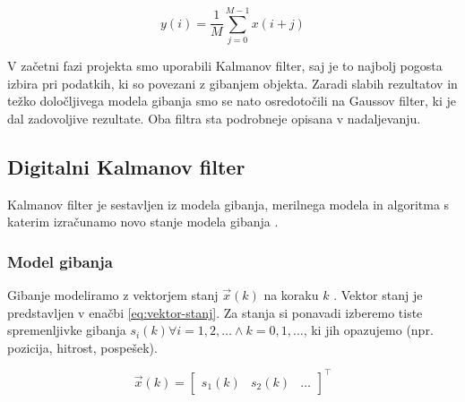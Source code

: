 {\begin{equation}
y(i) = \frac{1}{M} \sum_{j=0}^{M-1} x(i + j)
\label{eq:filter-tekocega-povprecja}
\end{equation}

V začetni fazi projekta smo uporabili Kalmanov filter, saj je to najbolj pogosta izbira pri podatkih, ki so povezani z gibanjem objekta. Zaradi slabih rezultatov in težko določljivega modela gibanja smo se nato osredotočili na Gaussov filter, ki je dal zadovoljive rezultate. Oba filtra sta podrobneje opisana v nadaljevanju.





\subsection{Digitalni Kalmanov filter}\label{sec:kalmanov-filter}
Kalmanov filter je sestavljen iz modela gibanja, merilnega modela in algoritma s katerim izračunamo novo stanje modela gibanja \cite{trucco1998introductory}.

\subsubsection{Model gibanja}
Gibanje modeliramo z vektorjem stanj $\vec{x}(k)$ na koraku $k$ \cite{trucco1998introductory}. Vektor stanj je predstavljen v enačbi \eqref{eq:vektor-stanj}. Za stanja si ponavadi izberemo tiste spremenljivke gibanja $s_i(k) \forall i = 1,2,\ldots \land k = 0, 1,\ldots$, ki jih opazujemo (npr. pozicija, hitrost, pospešek).

\begin{equation}
\vec{x}(k) = \begin{bmatrix}
					s_1(k) & s_2(k) & \ldots
\end{bmatrix}^\top
\label{eq:vektor-stanj} 
\end{equation}


}
